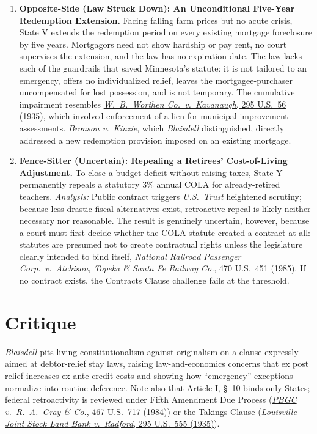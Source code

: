 \documentclass[12pt]{article}
\begin{document}
\begin{enumerate}
\item \textbf{Opposite-Side (Law Struck Down): An Unconditional Five-Year Redemption Extension.} Facing falling farm prices but no acute crisis, State V extends the redemption period on every existing mortgage foreclosure by five years. Mortgagors need not show hardship or pay rent, no court supervises the extension, and the law has no expiration date. The law lacks each of the guardrails that saved Minnesota's statute: it is not tailored to an emergency, offers no individualized relief, leaves the mortgagee-purchaser uncompensated for lost possession, and is not temporary. The cumulative impairment resembles \href{https://supreme.justia.com/cases/federal/us/295/56/}{\emph{W.\ B.\ Worthen Co.\ v.\ Kavanaugh}, 295 U.S.\ 56 (1935)}, which involved enforcement of a lien for municipal improvement assessments. \emph{Bronson v.\ Kinzie}, which \textit{Blaisdell} distinguished, directly addressed a new redemption provision imposed on an existing mortgage.

\item \textbf{Fence-Sitter (Uncertain): Repealing a Retirees' Cost-of-Living Adjustment.} To close a budget deficit without raising taxes, State Y permanently repeals a statutory 3\% annual COLA for already-retired teachers. \emph{Analysis:} Public contract triggers \emph{U.S.\ Trust} heightened scrutiny; because less drastic fiscal alternatives exist, retroactive repeal is likely neither necessary nor reasonable. The result is genuinely uncertain, however, because a court must first decide whether the COLA statute created a contract at all: statutes are presumed not to create contractual rights unless the legislature clearly intended to bind itself, \textit{National Railroad Passenger Corp.\ v.\ Atchison, Topeka \& Santa Fe Railway Co.}, 470 U.S.\ 451 (1985). If no contract exists, the Contracts Clause challenge fails at the threshold.

\end{enumerate}

\section{Critique}
\emph{Blaisdell} pits living constitutionalism against originalism on a clause expressly aimed at debtor-relief stay laws, raising law-and-economics concerns that ex post relief increases ex ante credit costs and showing how ``emergency'' exceptions normalize into routine deference. Note also that Article I, \S\ 10 binds only States; federal retroactivity is reviewed under Fifth Amendment Due Process (\href{https://supreme.justia.com/cases/federal/us/467/717/}{\emph{PBGC v.\ R.\ A.\ Gray \& Co.}, 467 U.S.\ 717 (1984)}) or the Takings Clause (\href{https://supreme.justia.com/cases/federal/us/295/555/}{\emph{Louisville Joint Stock Land Bank v.\ Radford}, 295 U.S.\ 555 (1935)}).
\end{document}
